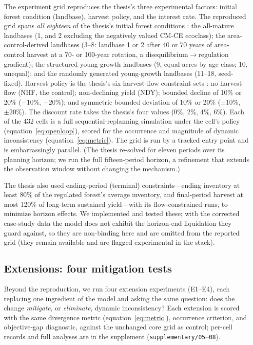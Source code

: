 The experiment grid reproduces the thesis's three experimental factors: initial forest condition (landbase), harvest policy, and the interest rate. The reproduced grid spans \emph{all eighteen} of the thesis's initial forest conditions \citep[Table~5.5]{daugherty1991credibility}: the all-mature landbases (1, and 2 excluding the negatively valued CM-CE ecoclass); the area-control-derived landbases (3--8: landbase 1 or 2 after 40 or 70 years of area-control harvest at a 70- or 100-year rotation, a disequilibrium\(\to\)regulation gradient); the structured young-growth landbases (9, equal acres by age class; 10, unequal); and the randomly generated young-growth landbases (11--18, seed-fixed). Harvest policy is the thesis's six harvest-flow constraint sets \citep[Table~5.6]{daugherty1991credibility}: no harvest flow (NHF, the control); non-declining yield (NDY); bounded decline of 10\% or 20\% (\(-10\%\), \(-20\%\)); and symmetric bounded deviation of 10\% or 20\% (\(\pm10\%\), \(\pm20\%\)). The discount rate takes the thesis's four values (0\%, 2\%, 4\%, 6\%). Each of the 432 cells is a full sequential-replanning simulation under the cell's policy (equation~\eqref{eq:openloop}), scored for the occurrence and magnitude of dynamic inconsistency (equation~\eqref{eq:metric}). The grid is run by a tracked entry point and is embarrassingly parallel. (The thesis re-solved for eleven periods over its planning horizon; we run the full fifteen-period horizon, a refinement that extends the observation window without changing the mechanism.)

The thesis also used ending-period (terminal) constraints---ending inventory at least 80\% of the regulated forest's average inventory, and final-period harvest at most 120\% of long-term sustained yield---with its flow-constrained runs, to minimize horizon effects. We implemented and tested these; with the corrected case-study data the model does not exhibit the horizon-end liquidation they guard against, so they are non-binding here and are omitted from the reported grid (they remain available and are flagged experimental in the stack).

\hypertarget{extensions-four-mitigation-tests}{%
\subsection{Extensions: four mitigation tests}\label{extensions-four-mitigation-tests}}

Beyond the reproduction, we run four extension experiments (E1--E4), each replacing one ingredient of the model and asking the same question: does the change \emph{mitigate}, or \emph{eliminate}, dynamic inconsistency? Each extension is scored with the same divergence metric (equation~\eqref{eq:metric}), occurrence criterion, and objective-gap diagnostic, against the unchanged core grid as control; per-cell records and full analyses are in the supplement (\texttt{supplementary/05}--\texttt{08}).

